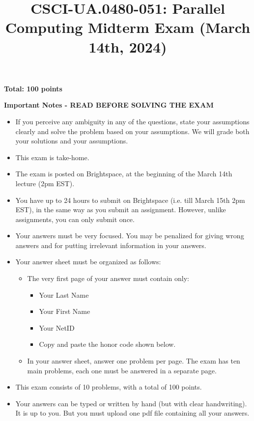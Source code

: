 \documentclass{article}
\title{CSCI-UA.0480-051: Parallel Computing Midterm Exam (March 14th, 2024)}
\author{}
\date{}
\begin{document}
\maketitle

\textbf{Total: 100 points}

\textbf{Important Notes - READ BEFORE SOLVING THE EXAM}

\begin{itemize}
    \item If you perceive any ambiguity in any of the questions, state your assumptions clearly and solve the problem based on your assumptions. We will grade both your solutions and your assumptions.
    \item This exam is take-home.
    \item The exam is posted on Brightspace, at the beginning of the March 14th lecture (2pm EST).
    \item You have up to 24 hours to submit on Brightspace (i.e. till March 15th 2pm EST), in the same way as you submit an assignment. However, unlike assignments, you can only submit once.
    \item Your answers must be very focused. You may be penalized for giving wrong answers and for putting irrelevant information in your answers.
    \item Your answer sheet must be organized as follows:
    \begin{itemize}
        \item The very first page of your answer must contain only:
        \begin{itemize}
            \item Your Last Name
            \item Your First Name
            \item Your NetID
            \item Copy and paste the honor code shown below.
        \end{itemize}
        \item In your answer sheet, answer one problem per page. The exam has ten main problems, each one must be answered in a separate page.
    \end{itemize}
    \item This exam consists of 10 problems, with a total of 100 points.
    \item Your answers can be typed or written by hand (but with clear handwriting). It is up to you. But you must upload one pdf file containing all your answers.
\end{itemize}
\end{document}
